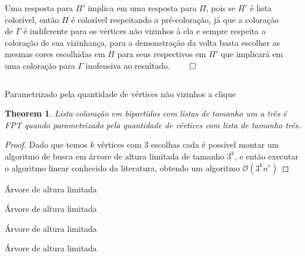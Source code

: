 \documentclass[9pt, compress]{beamer}
\newtheorem{teorema}{Theorem}
\newcommand{\?}{\textcolor{warn}{\textit{?}}}
\begin{document}
     \begin{frame}
       \begin{columns}
        \begin{column}{0.5\textwidth}
          Uma resposta para $\Pi'$ implica em uma resposta para $\Pi$, pois se $\Pi'$ é lista colorível, então $\Pi$ é colorível respeitando a pré-coloração, já que a coloração de $\Gamma$ é indiferente para os vértices não vizinhos à ela e sempre respeita a coloração de sua vizinhança, para a demonstração da volta basta escolher as mesmas cores escolhidas em $\Pi$ para seus respectivos em $\Pi'$ que implicará em uma coloração para $\Gamma$ inofensiva ao resultado. $\qed$
        \end{column}
        \begin{column}{0.5\textwidth}
        \end{column}
      \end{columns}
     \end{frame}
     \begin{frame}{Parametrizado pela quantidade de vértices não vizinhos a clique}
       
        \begin{teorema}
         Lista coloração em bipartidos com listas de tamanho um a três é FPT quando parametrizado pela quantidade de vértices com lista de tamanho três.
        \end{teorema}
        \begin{proof}
         Dado que temos $k$ vértices com 3 escolhas cada é possível montar um algoritmo de busca em árvore de altura limitada de tamanho $3^k$, e então executar o algoritmo linear conhecido da literatura, obtendo um algoritmo $\mathcal{O}(3^kn^{c})$
\end{proof}
     \end{frame}
     \begin{frame}{Árvore de altura limitada}
       \begin{figure}[H]
        \centering
        \fontsize{4}{10}
        
      \end{figure}
     \end{frame}
     \begin{frame}{Árvore de altura limitada}
       \begin{figure}[H]
        \centering
        \fontsize{4}{10}
        
      \end{figure}
     \end{frame}
     \begin{frame}{Árvore de altura limitada}
       \begin{figure}[H]
        \centering
        \fontsize{4}{10}
        
      \end{figure}
     \end{frame}
     \begin{frame}{Árvore de altura limitada}
       \begin{figure}[H]
        \centering
        \fontsize{4}{10}
        
      \end{figure}
     \end{frame}
\end{document}
